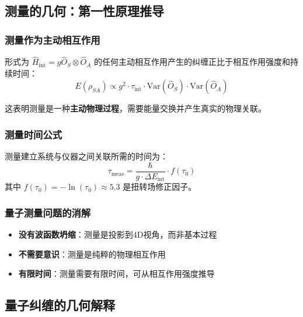 \subsection{测量的几何：第一性原理推导}

\subsubsection{测量作为主动相互作用}

\begin{theorem}[主动相互作用产生纠缠]
形式为 $\hat{H}_{\text{int}} = g \hat{O}_S \otimes \hat{O}_A$ 的任何主动相互作用产生的纠缠正比于相互作用强度和持续时间：
\begin{equation}
    E(\rho_{SA}) \propto g^2 \cdot \tau_{\text{int}} \cdot \text{Var}(\hat{O}_S) \cdot \text{Var}(\hat{O}_A)
\end{equation}
\end{theorem}

这表明测量是一种\textbf{主动物理过程}，需要能量交换并产生真实的物理关联。

\subsubsection{测量时间公式}

\begin{theorem}[第一性原理测量时间]
测量建立系统与仪器之间关联所需的时间为：
\begin{equation}
    \boxed{\tau_{\text{meas}} = \frac{\hbar}{g \cdot \Delta E_{\text{int}}} \cdot f(\tau_0)}
\end{equation}
其中 $f(\tau_0) = -\ln(\tau_0) \approx 5.3$ 是扭转场修正因子。
\end{theorem}

\subsubsection{量子测量问题的消解}

\begin{itemize}
    \item \textbf{没有波函数坍缩}：测量是投影到4D视角，而非基本过程
    \item \textbf{不需要意识}：测量是纯粹的物理相互作用
    \item \textbf{有限时间}：测量需要有限时间，可从相互作用强度推导
\end{itemize}

\subsection{量子纠缠的几何解释}

